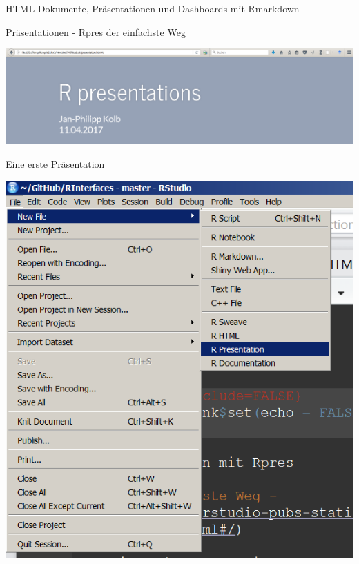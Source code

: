 \documentclass[ignorenonframetext,]{beamer}
\begin{document}
\begin{frame}[fragile]{HTML Dokumente, Präsentationen und Dashboards mit
Rmarkdown}

\begin{block}{\href{https://rstudio-pubs-static.s3.amazonaws.com/27777_55697c3a476640caa0ad2099fe914ae5.html\#/}{Präsentationen
- Rpres der einfachste Weg}}

\includegraphics{./tex2pdf.9796/826168065f46aef1f3f31ea59c3eaa9eff8f6c6e.png}

\end{block}

\begin{block}{Eine erste Präsentation}

\includegraphics{./tex2pdf.9796/efff602422f4bc4b12bbb57ca2d3ec65e6ee4dc3.png}

\end{block}


\end{frame}
\end{document}
